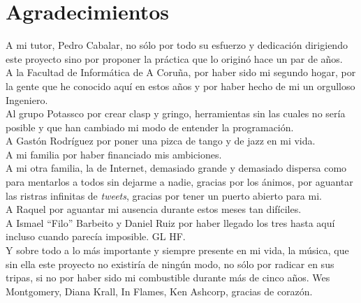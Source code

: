 \thispagestyle{empty}
\section*{Agradecimientos}
A mi tutor, Pedro Cabalar, no sólo por todo su esfuerzo y dedicación dirigiendo este proyecto sino por proponer la práctica que lo originó hace un par de años. \\
A la Facultad de Informática de A Coruña, por haber sido mi segundo hogar, por la gente que he conocido aquí en estos años y por haber hecho de mi un orgulloso Ingeniero. \\
Al grupo Potassco por crear clasp y gringo, herramientas sin las cuales no sería posible y que han cambiado mi modo de entender la programación. \\
A Gastón Rodríguez por poner una pizca de tango y de jazz en mi vida. \\
A mi familia por haber financiado mis ambiciones. \\
A mi otra familia, la de Internet, demasiado grande y demasiado dispersa como para mentarlos a todos sin dejarme a nadie, gracias por los ánimos, por aguantar las ristras infinitas de \textit{tweets}, gracias por tener un puerto abierto para mi. \\
A Raquel por aguantar mi ausencia durante estos meses tan difíciles. \\
A Ismael ``Filo'' Barbeito y Daniel Ruiz por haber llegado los tres hasta aquí incluso cuando parecía imposible. GL HF. \\
Y sobre todo a lo más importante y siempre presente en mi vida, la música, que sin ella este proyecto no existiría de ningún modo, no sólo por radicar en sus tripas, si no por haber sido mi combustible durante más de cinco años. Wes Montgomery, Diana Krall, In Flames, Ken Ashcorp, gracias de corazón. \\